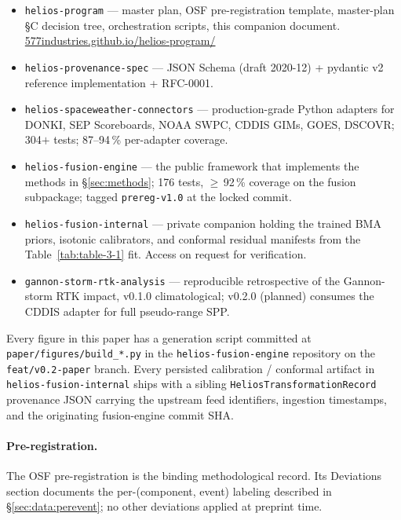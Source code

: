 \documentclass[11pt,letterpaper]{article}
\begin{document}
\begin{itemize}[leftmargin=*,itemsep=0pt]
  \item \texttt{helios-program} \cite{helios_program} ---
        master plan, OSF pre-registration template, master-plan §C decision
        tree, orchestration scripts, this companion document.
        \href{https://577industries.github.io/helios-program/}%
             {577industries.github.io/helios-program/}
  \item \texttt{helios-provenance-spec} \cite{helios_provenance_spec} ---
        JSON Schema (draft 2020-12) + pydantic v2 reference implementation
        + RFC-0001.
  \item \texttt{helios-spaceweather-connectors} \cite{helios_connectors} ---
        production-grade Python adapters for DONKI, SEP Scoreboards, NOAA
        SWPC, CDDIS GIMs, GOES, DSCOVR; 304$+$ tests; 87--94\,\% per-adapter
        coverage.
  \item \texttt{helios-fusion-engine} \cite{helios_fusion_engine} ---
        the public framework that implements the methods in
        §\ref{sec:methods}; 176 tests, $\ge$\,92\,\% coverage on the
        fusion subpackage; tagged \texttt{prereg-v1.0} at the locked
        commit.
  \item \texttt{helios-fusion-internal} --- private companion holding the
        trained BMA priors, isotonic calibrators, and conformal residual
        manifests from the Table~\ref{tab:table-3-1} fit.  Access on
        request for verification.
  \item \texttt{gannon-storm-rtk-analysis} \cite{gannon_rtk} ---
        reproducible retrospective of the Gannon-storm RTK impact,
        v0.1.0 climatological;
        v0.2.0 (planned) consumes the CDDIS adapter for full
        pseudo-range SPP.
\end{itemize}

Every figure in this paper has a generation script committed at
\texttt{paper/figures/build\_*.py} in the
\texttt{helios-fusion-engine} repository on the \texttt{feat/v0.2-paper}
branch.  Every persisted calibration / conformal artifact in
\texttt{helios-fusion-internal} ships with a sibling
\texttt{HeliosTransformationRecord} provenance JSON
\cite{helios_provenance_spec} carrying the upstream feed identifiers,
ingestion timestamps, and the originating fusion-engine commit SHA.

\paragraph{Pre-registration.}
The OSF pre-registration \cite{osf_prereg} is the binding methodological
record.  Its Deviations section documents the per-(component, event)
labeling described in §\ref{sec:data:perevent}; no other deviations
applied at preprint time.
\end{document}
